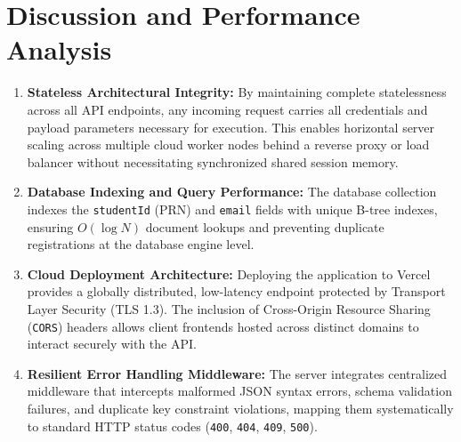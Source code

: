 \documentclass[11pt,a4paper]{article}
\begin{document}
\section{Discussion and Performance Analysis}
\begin{enumerate}
    \item \textbf{Stateless Architectural Integrity:} By maintaining complete statelessness across all API endpoints, any incoming request carries all credentials and payload parameters necessary for execution. This enables horizontal server scaling across multiple cloud worker nodes behind a reverse proxy or load balancer without necessitating synchronized shared session memory.
    \item \textbf{Database Indexing and Query Performance:} The database collection indexes the \texttt{studentId} (PRN) and \texttt{email} fields with unique B-tree indexes, ensuring $O(\log N)$ document lookups and preventing duplicate registrations at the database engine level.
    \item \textbf{Cloud Deployment Architecture:} Deploying the application to Vercel provides a globally distributed, low-latency endpoint protected by Transport Layer Security (TLS 1.3). The inclusion of Cross-Origin Resource Sharing (\texttt{CORS}) headers allows client frontends hosted across distinct domains to interact securely with the API.
    \item \textbf{Resilient Error Handling Middleware:} The server integrates centralized middleware that intercepts malformed JSON syntax errors, schema validation failures, and duplicate key constraint violations, mapping them systematically to standard HTTP status codes (\texttt{400}, \texttt{404}, \texttt{409}, \texttt{500}).
\end{enumerate}

\end{document}
